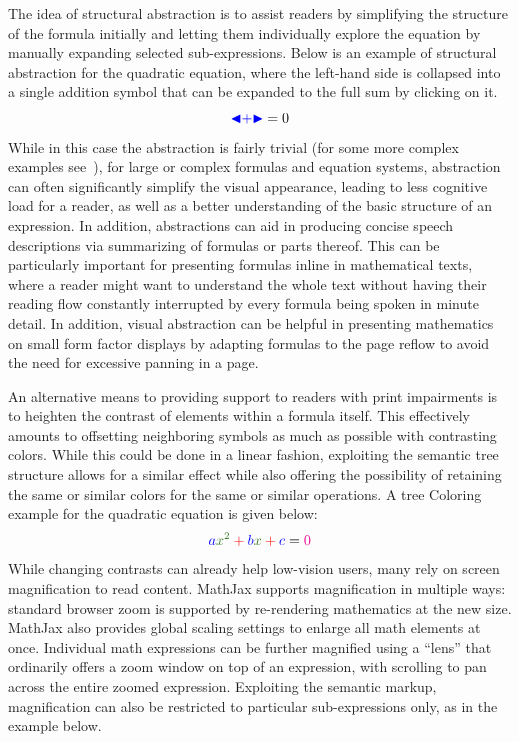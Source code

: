 \documentclass{sig-alternate}
\def\collapse#1{\textcolor{blue}{\ensuremath{\mathord{\blacktriangleleft}
\mathord{#1}
\mathord{\blacktriangleright}}}}
\begin{document}
The idea of structural abstraction is to assist readers by simplifying the
structure of the formula initially and letting them individually explore the
equation by manually expanding selected sub-expressions. Below is an example of
structural abstraction for the quadratic equation, where the left-hand side is
collapsed into a single addition symbol that can be expanded to the full sum by
clicking on it.
\[\collapse{+}=0\]
While in this case the abstraction is fairly trivial (for some more complex
examples see~\cite{cervone2016towards}), for large or complex formulas and
equation systems, abstraction can often significantly simplify the visual
appearance, leading to less cognitive load for a reader, as well as a better
understanding of the basic structure of an expression. In addition, abstractions
can aid in producing concise speech descriptions via summarizing of formulas
or parts thereof. This can be particularly important for presenting formulas
inline in mathematical texts, where a reader might want to understand the whole
text without having their reading flow constantly interrupted by every formula
being spoken in minute detail. In addition, visual abstraction can be helpful in
presenting mathematics on small form factor displays by adapting formulas to the
page reflow to avoid the need for excessive panning in a page.


An alternative means to providing support to readers with print impairments is
to heighten the contrast of elements within a formula itself. This effectively
amounts to offsetting neighboring symbols as much as possible with contrasting
colors. While this could be done in a linear fashion, exploiting the semantic
tree structure allows for a similar effect while also offering the possibility
of retaining the same or similar colors for the same or similar operations. A
tree Coloring example for the quadratic equation is given below:
\[\color{blue}a \color{OliveGreen}x^2 \color{red}+ \color{blue}b
  \color{OliveGreen}x \color{red}+ \color{blue}c \color{black}= \color{magenta}0\]
While changing contrasts can already help low-vision users, many rely on screen
magnification to read content.  MathJax supports magnification in multiple ways:
standard browser zoom is supported by re-rendering mathematics at the new size.
MathJax also provides global scaling settings to enlarge all math elements at
once.  Individual math expressions can be further magnified using a ``lens''
that ordinarily offers a zoom window on top of an expression, with scrolling to
pan across the entire zoomed expression. Exploiting the semantic markup,
magnification can also be restricted to particular sub-expressions only, as in
the example below.
\end{document}

